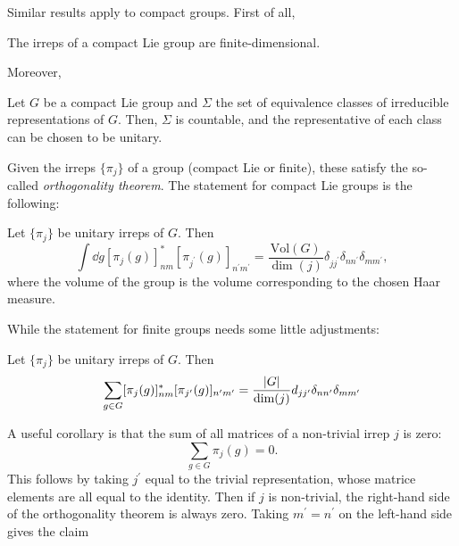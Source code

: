 Similar results apply to compact groups.
First of all,

\begin{theorem}
    The irreps of a compact Lie group are finite-dimensional.
\end{theorem}

Moreover,

\begin{theorem}
    Let $G$ be a compact Lie group and $\Sigma$ the set of equivalence classes of irreducible representations of $G$.
    Then, $\Sigma$ is countable, and the representative of each class can be chosen to be unitary.
\end{theorem}

Given the irreps $\{\pi_j\}$ of a group (compact Lie or finite), these satisfy the so-called \emph{orthogonality theorem}.
The statement for compact Lie groups is the following:

\begin{theorem}
    Let $\{\pi_j\}$ be unitary irreps of $G$.
    Then
    \begin{equation}
        \int \dd g [\pi_j(g)]_{nm}^{\ast} [\pi_{j^{\prime}}(g)]_{n^{\prime} m^{\prime}}
        = \frac{\text{Vol}(G)}{\dim(j)} \delta_{j j^{\prime} } \delta_{n n^{\prime}} \delta_{m m^{\prime}},
    \end{equation}
    where the volume of the group is the volume corresponding to the chosen Haar measure.
\end{theorem}

While the statement for finite groups needs some little adjustments:

\begin{theorem}
    Let $\{\pi_j\}$ be unitary irreps of $G$.
    Then
    \begin{equation}
        \sum_{g \in G} [\pi_j(g)]_{nm}^{\ast} [\pi_{j^{\prime}}(g)]_{n^{\prime} m^{\prime}}
        = \frac{\abs{G}}{\text{\normalfont dim}(j)} d_{j j^{\prime}} \delta_{n n^{\prime}} \delta_{m m^{\prime}}
    \end{equation}
\end{theorem}

A useful corollary is that the sum of all matrices of a non-trivial irrep $j$ is zero:
\begin{equation}
    \sum_{g \in G} \pi_j(g) = 0.
\end{equation}
This follows by taking $j^{\prime}$ equal to the trivial representation, whose matrice elements are all equal to the identity.
Then if $j$ is non-trivial, the right-hand side of the orthogonality theorem is always zero.
Taking $m^{\prime} = n^{\prime}$ on the left-hand side gives the claim


